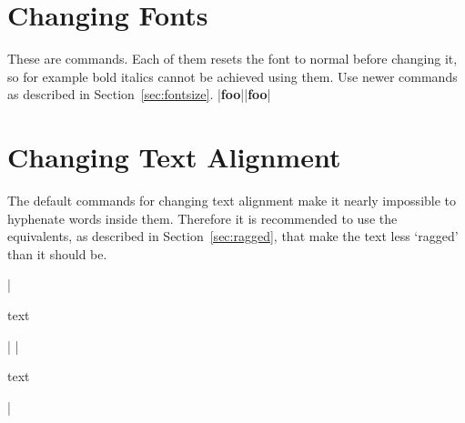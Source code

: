 \section{Changing Fonts}

These are  commands. Each of them resets the font to normal
before changing it, so for example bold italics cannot be achieved using them.
Use newer commands as described in Section~\ref{sec:fontsize}.
\chto|{\bf foo}||{\bfseries foo}|

\section{Changing Text Alignment}

The default  commands for changing text alignment make it
nearly impossible to hyphenate words inside them. Therefore it is recommended
to use the  equivalents, as described in
Section~\ref{sec:ragged}, that make the text less \enquote*{ragged} than it
should be.
\begin{chktexignore}  
\chto|\begin{center}
  text
\end{center}|
|\usepackage{ragged2e}
\begin{Center}
  text
\end{Center}|
\end{chktexignore}
\egroup

